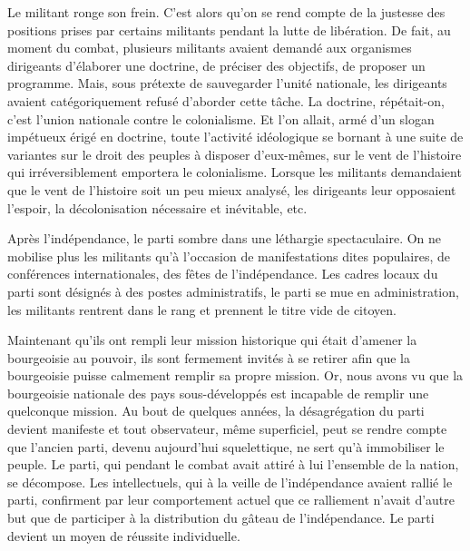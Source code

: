 \documentclass[french,twoside]{book} %
\begin{document}
\bigbreak
\noindent Le militant ronge son frein. C’est alors qu’on se rend compte de la justesse des positions prises par certains militants pendant la lutte de libération. De fait, au moment du combat, plusieurs militants avaient demandé aux organismes dirigeants d’élaborer une doctrine, de préciser des objectifs, de proposer un programme. Mais, sous prétexte de sauvegarder l’unité nationale, les dirigeants avaient catégoriquement refusé d’aborder cette tâche. La doctrine, répétait-on, c’est l’union nationale contre le colonialisme. Et l’on allait, armé d’un slogan impétueux érigé en doctrine, toute l’activité idéologique se bornant à une suite de variantes sur le droit des peuples à disposer d’eux-mêmes, sur le vent de l’histoire qui irréversiblement emportera le colonialisme. Lorsque les militants demandaient que le vent de l’histoire soit un peu mieux analysé, les dirigeants leur opposaient l’espoir, la décolonisation nécessaire et inévitable, etc.\par
Après l’indépendance, le parti sombre dans une léthargie spectaculaire. On ne mobilise plus les militants qu’à l’occasion de manifestations dites populaires, de conférences internationales, des fêtes de l’indépendance. Les cadres locaux du parti sont désignés à des postes administratifs, le parti se mue en administration, les militants rentrent dans le rang et prennent le titre vide de citoyen.\par
Maintenant qu’ils ont rempli leur mission historique qui était d’amener la bourgeoisie au pouvoir, ils sont fermement invités à se retirer afin que la bourgeoisie puisse calmement remplir sa propre mission. Or, nous avons vu que la bourgeoisie nationale des pays sous-développés est incapable de remplir une quelconque mission. Au bout de quelques années, la désagrégation du parti devient manifeste et tout observateur, même superficiel, peut se rendre compte que l’ancien parti, devenu aujourd’hui squelettique, ne sert qu’à immobiliser le peuple. Le parti, qui pendant le combat avait attiré à lui l’ensemble de la nation, se décompose. Les intellectuels, qui à la veille de l’indépendance   avaient rallié le parti, confirment par leur comportement actuel que ce ralliement n’avait d’autre but que de participer à la distribution du gâteau de l’indépendance. Le parti devient un moyen de réussite individuelle.\par
\bigbreak
\end{document}
